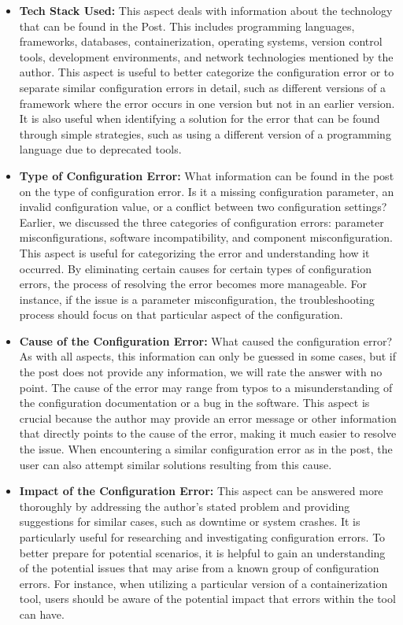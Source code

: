 \documentclass[english,bachelor]{swsLeipzig}
\begin{document}
\begin{itemize}
  \item \textbf{Tech Stack Used:} This aspect deals with information about the technology that can be found in the Post. This includes programming languages, frameworks, databases, containerization, operating systems, version control tools, development environments, and network technologies mentioned by the author. This aspect is useful to better categorize the configuration error or to separate similar configuration errors in detail, such as different versions of a framework where the error occurs in one version but not in an earlier version. It is also useful when identifying a solution for the error that can be found through simple strategies, such as using a different version of a programming language due to deprecated tools.
  \item \textbf{Type of Configuration Error:} What information can be found in the post on the type of configuration error. Is it a missing configuration parameter, an invalid configuration value, or a conflict between two configuration settings? Earlier, we discussed the three categories of configuration errors: parameter misconfigurations, software incompatibility, and component misconfiguration. This aspect is useful for categorizing the error and understanding how it occurred. By eliminating certain causes for certain types of configuration errors, the process of resolving the error becomes more manageable. For instance, if the issue is a parameter misconfiguration, the troubleshooting process should focus on that particular aspect of the configuration.
  \item \textbf{Cause of the Configuration Error:} What caused the configuration error? As with all aspects, this information can only be guessed in some cases, but if the post does not provide any information, we will rate the answer with no point. The cause of the error may range from typos to a misunderstanding of the configuration documentation or a bug in the software. This aspect is crucial because the author may provide an error message or other information that directly points to the cause of the error, making it much easier to resolve the issue. When encountering a similar configuration error as in the post, the user can also attempt similar solutions resulting from this cause.
  \item \textbf{Impact of the Configuration Error:} This aspect can be answered more thoroughly by addressing the author's stated problem and providing suggestions for similar cases, such as downtime or system crashes. It is particularly useful for researching and investigating configuration errors. To better prepare for potential scenarios, it is helpful to gain an understanding of the potential issues that may arise from a known group of configuration errors. For instance, when utilizing a particular version of a containerization tool, users should be aware of the potential impact that errors within the tool can have.

\end{itemize}
\end{document}
